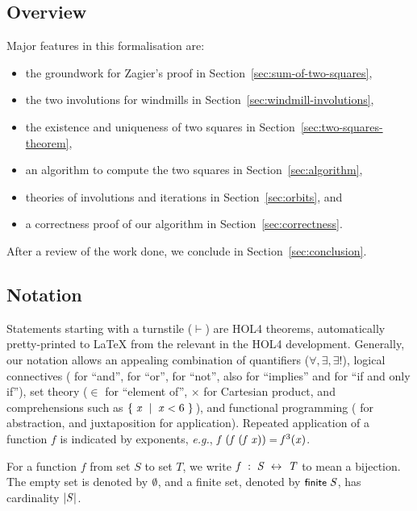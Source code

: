 \documentclass[sigplan,screen]{acmart}
\newcommand{\m}[1]{\todo[fancyline,color=blue!40,size=\scriptsize]{\textsf{JC: #1}}} %
\newcommand{\eg}{\textit{e.g.}}
\renewcommand{\HOLinline}[1]{\ensuremath{#1}} %
\renewcommand{\HOLConst}[1]{{\fontsize{9pt}{1em}\selectfont\textsf{\upshape #1}}}
\renewcommand{\HOLNumLit}[1]{{\selectfont\textrm{\upshape #1}}} %
\renewcommand{\HOLSymConst}[1]{{\fontsize{9pt}{1em}\selectfont\textsf{\upshape #1}}}
\renewcommand{\HOLTokenBar}{\ensuremath{\mid}}
\begin{document}
\subsection{Overview}
\label{sec:overview}
Major features in this formalisation are:
\begin{itemize}[leftmargin=*] %
\item the groundwork for Zagier's proof in Section~\ref{sec:sum-of-two-squares},
\item the two involutions for windmills in Section~\ref{sec:windmill-involutions},
\item the existence and uniqueness of two squares in Section~\ref{sec:two-squares-theorem},
\item an algorithm to compute the two squares in Section~\ref{sec:algorithm},
\item theories of involutions and iterations in Section~\ref{sec:orbits}, and
\item a correctness proof of our algorithm in Section~\ref{sec:correctness}.
\end{itemize}
After a review of the work done, we conclude in Section~\ref{sec:conclusion}.


\subsection{Notation}
\label{sec:notations}
Statements starting with a turnstile ($\vdash$) are HOL4 theorems,
automatically pretty-printed to \LaTeX{} from the relevant  in the HOL4 development.
Generally, our notation allows an appealing combination of quantifiers ($\forall, \exists, \exists{!}$),
logical connectives (\HOLTokenConj{} for ``and'', \HOLTokenDisj{} for ``or'', \HOLTokenNeg{} for ``not'', also \HOLTokenImp{} for ``implies'' and \HOLTokenEquiv{} for ``if and only if''),
set theory ($\in$ for ``element of'', $\times$ for Cartesian product, and comprehensions such as \HOLinline{\HOLTokenLeftbrace{}\HOLBoundVar{x}\;\HOLTokenBar{}\;\HOLBoundVar{x}\;\HOLSymConst{\HOLTokenLt{}}\;\HOLNumLit{6}\HOLTokenRightbrace{}}),
and functional programming (\HOLTokenLambda{} for abstraction, and juxtaposition for application).
Repeated application of a function $f$ is indicated by exponents,
\eg, \HOLinline{\HOLFreeVar{f}\;(\HOLFreeVar{f}\;(\HOLFreeVar{f}\;\HOLFreeVar{x}))\;\HOLSymConst{=}\;\HOLFreeVar{f}\ensuremath{\sp{\HOLNumLit{3}}(\HOLFreeVar{x})}}.

For a function $f$ from set $S$ to set $T$,
we write \HOLinline{\HOLFreeVar{f}\;\ensuremath{:}\;\HOLFreeVar{S}\;\ensuremath{\leftrightarrow}\;\HOLFreeVar{T}} to mean a bijection.
The empty set is denoted by \HOLinline{\HOLSymConst{\HOLTokenEmpty{}}},
and a finite set, denoted by \HOLinline{\HOLConst{\HOLConst{finite}}\;\HOLFreeVar{S}},
has cardinality \HOLinline{\ensuremath{|}\HOLFreeVar{S}\ensuremath{|}}.
\end{document}
